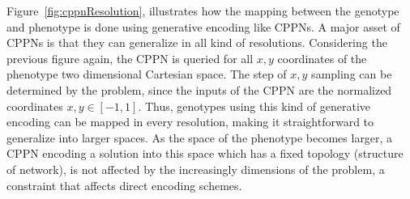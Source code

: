 Figure~\ref{fig:cppnResolution}, illustrates how the mapping between the genotype and phenotype is done using generative encoding like CPPNs. A major asset of CPPNs is that they can generalize in all kind of resolutions. Considering the previous figure again, the CPPN is queried for all $x,y$ coordinates of the phenotype two dimensional Cartesian space. The step of $x,y$ sampling can be determined by the problem, since the inputs of the CPPN are the normalized coordinates $x,y \in [-1,1]$. Thus, genotypes using this kind of generative encoding can be mapped in every resolution, making it straightforward to generalize into larger spaces. As the space of the phenotype becomes larger, a CPPN encoding a solution into this space which has a fixed topology (structure of network), is not affected by the increasingly dimensions of the problem, a constraint that affects direct encoding schemes.


